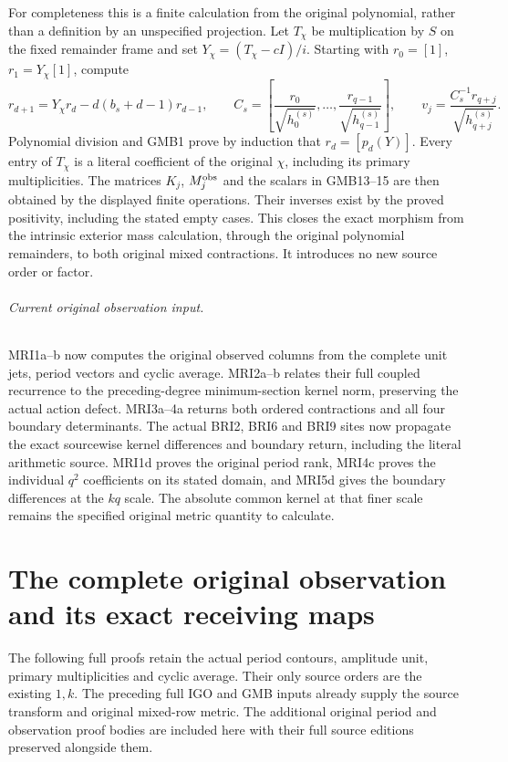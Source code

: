 \documentclass[11pt,a4paper]{article}
\begin{document}
For completeness this is a finite calculation from the original
polynomial, rather than a definition by an unspecified projection.
Let $T_\chi$ be multiplication by $S$ on the fixed remainder frame
and set $Y_\chi=(T_\chi-cI)/i$. Starting with
$r_0=[1]$, $r_1=Y_\chi[1]$, compute
\[
 r_{d+1}=Y_\chi r_d-d(b_s+d-1)r_{d-1},\qquad
 C_s=\left[\frac{r_0}{\sqrt{h_0^{(s)}}},\ldots,
                 \frac{r_{q-1}}{\sqrt{h_{q-1}^{(s)}}}\right],
 \qquad v_j=\frac{C_s^{-1}r_{q+j}}{\sqrt{h_{q+j}^{(s)}}}.
 \tag{GMB16}
\]
Polynomial division and GMB1 prove by induction that $r_d=[p_d(Y)]$.
Every entry of $T_\chi$ is a literal coefficient of the original
$\chi$, including its primary multiplicities. The matrices
$K_j$, $M_j^{\rm obs}$ and the scalars in GMB13--15 are then obtained
by the displayed finite operations. Their inverses exist by the
proved positivity, including the stated empty cases. This closes
the exact morphism from the intrinsic exterior mass calculation,
through the original polynomial remainders, to both original
mixed contractions. It introduces no new source order or factor.




\paragraph{Current original observation input.}
MRI1a--b now computes the original observed columns from the complete
unit jets, period vectors and cyclic average. MRI2a--b relates their
full coupled recurrence to the preceding-degree minimum-section kernel
norm, preserving the actual action defect. MRI3a--4a returns both
ordered contractions and all four boundary determinants. The actual
BRI2, BRI6 and BRI9 sites now propagate the exact sourcewise
kernel differences and boundary return, including the literal
arithmetic source. MRI1d proves the original period rank, MRI4c
proves the individual $q^2$ coefficients on its stated domain,
and MRI5d gives the boundary differences at the $kq$ scale.
The absolute common kernel at that finer scale remains the
specified original metric quantity to calculate.

\clearpage
\part*{The complete original observation and its exact receiving maps}
The following full proofs retain the actual period contours, amplitude
unit, primary multiplicities and cyclic average. Their only source
orders are the existing $1,k$. The preceding full IGO and GMB inputs
already supply the source transform and original mixed-row metric.
The additional original period and observation proof bodies are
included here with their full source editions preserved alongside them.
\end{document}
